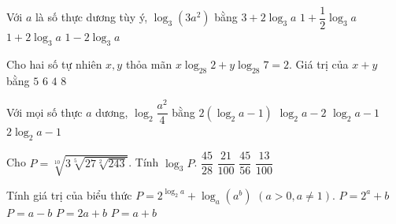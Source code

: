 \begin{ex}%
	 Với $a$ là số thực dương tùy ý, $\log_3(3a^2)$ bằng
	 \choice
		 {$3+2\log_3a$}
		 {$1+\dfrac{1}{2} \log_3a$}
		 {\True $1+2\log_3a$}
		 {$1-2\log_3a$}
\end{ex}

\begin{ex}%
	Cho hai số tự nhiên $x, y$ thỏa mãn $x \log _{28} 2+y \log _{28} 7=2$. Giá trị của $x+y$  bằng
	 \choice
		{$5$} 
		{\True $6$} 
		{$4$} 
		{$8$} 
\end{ex}

\begin{ex}%
	Với mọi số  thực $a$ dương, $\log_2\dfrac{a^2}{4}$ bằng
	 \choice
		 {\True $2\left(\log_2a-1\right)$}
		 {$\log_2a-2$}
		 {$\log_2a-1$}
		{$2\log_2a-1$} 
\end{ex}

\begin{ex}%
	 Cho $P=\sqrt[10]{3\sqrt[5]{27\sqrt[2]{243}}}$. Tính $\log_3P$.
	 \choice
		 {$\dfrac{45}{28}$}
		{\True $\dfrac{21}{100}$} 
		 {$\dfrac{45}{56}$}
		{$\dfrac{13}{100}$} 
\end{ex}

\begin{ex}%
	Tính giá trị của biểu thức $P=2^{\log_{2}a}+\log_{a}\left(a^{b}\right)$  $\left(a>0,a\ne1\right)$.
	 \choice
		{$P=2^{a}+b$} 
		 {$P=a-b$}
		{$P=2a+b$} 
		 {\True $P=a+b$}
\end{ex}

